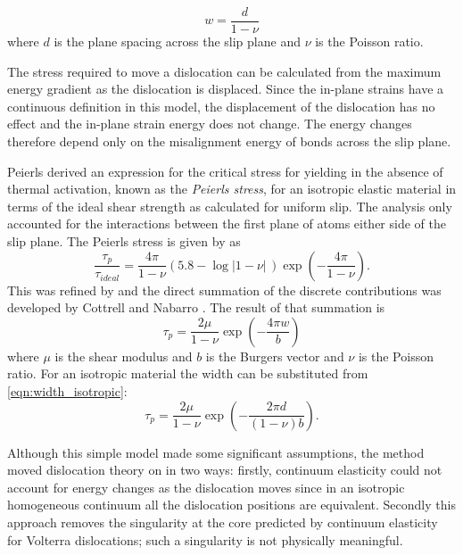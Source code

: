 \begin{equation}
w = \frac{d}{1-\nu}
\label{eqn:width_isotropic}
\end{equation}
where $d$ is the plane spacing across the slip plane and $\nu$ is the Poisson ratio.

The stress required to move a dislocation can be calculated from the maximum energy gradient as the dislocation is displaced. Since the in-plane strains have a continuous definition in this model, the displacement of the dislocation has no effect and the in-plane strain energy does not change. The energy changes therefore depend only on the misalignment energy of bonds across the slip plane.

Peierls derived an expression for the critical stress for yielding in the absence of thermal activation, known as the \emph{Peierls stress}, for an isotropic elastic material in terms of the ideal shear strength as calculated for uniform slip. The analysis only accounted for the interactions between the first plane of atoms either side of the slip plane. The Peierls stress is given by as
\begin{equation}
\frac{\tau_p}{\tau_{ideal}} = \frac{4 \pi}{1 - \nu} (5.8 - \log|1-\nu|\,) \exp\left(-\frac{4\pi}{1 - \nu}\right).
\end{equation}
This was refined by \citet{Nabarro1947} and the direct summation of the discrete contributions was developed by Cottrell and Nabarro \cite{Cottrell1953}. The result of that summation is
\begin{equation}
\tau_p = \frac{2\mu}{1-\nu} \exp\left( - \frac{4\pi w}{b} \right)
\end{equation}
where $\mu$ is the shear modulus and $b$ is the Burgers vector and $\nu$ is the Poisson ratio. For an isotropic material the width can be substituted from \autoref{eqn:width_isotropic}:
\begin{equation}
\tau_p = \frac{2\mu}{1-\nu} \exp\left( - \frac{2\pi d}{(1-\nu)b} \right).
\label{eqn:Peierls_Stress}
\end{equation}

Although this simple model made some significant assumptions, the method moved dislocation theory on in two ways: firstly, continuum elasticity could not account for energy changes as the dislocation moves since in an isotropic homogeneous continuum all the dislocation positions are equivalent. Secondly this approach removes the singularity at the core predicted by continuum elasticity for Volterra dislocations; such a singularity is not physically meaningful.


